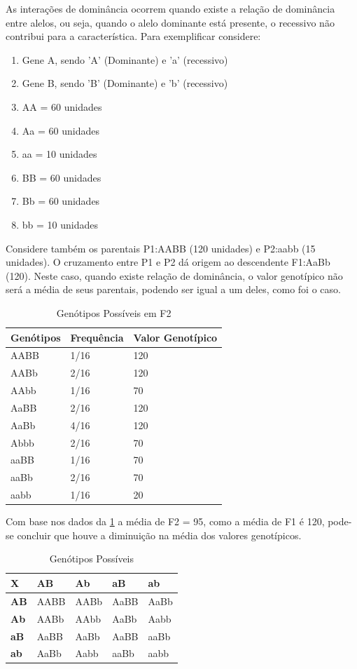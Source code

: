 As interações de dominância ocorrem quando existe a relação de dominância entre alelos, ou seja, quando o alelo dominante está presente, o recessivo não contribui para a característica. Para exemplificar considere:

\begin{enumerate}
\item Gene A, sendo 'A' (Dominante) e 'a' (recessivo)
\item Gene B, sendo 'B' (Dominante) e 'b' (recessivo)
\item AA = 60 unidades
\item Aa = 60 unidades
\item aa = 10 unidades
\item BB = 60 unidades
\item Bb = 60 unidades
\item bb = 10 unidades
\end{enumerate}

Considere também os parentais P1:AABB (120 unidades) e P2:aabb (15 unidades). O cruzamento entre P1 e P2 dá origem ao descendente F1:AaBb (120). Neste caso, quando existe relação de dominância, o valor genotípico não será a média de seus parentais, podendo ser igual a um deles, como foi o caso.


\begin{table}[h]
\centering
\begin{tabular}{l l l}
\toprule
 \textbf{Genótipos} & \textbf{Frequência} & \textbf{Valor Genotípico}\\
\midrule
 AABB & 1/16 & 120 \\
 AABb & 2/16 & 120 \\
 AAbb & 1/16 & 70  \\
 AaBB & 2/16 & 120 \\
 AaBb & 4/16 & 120 \\
 Abbb & 2/16 & 70  \\
 aaBB & 1/16 & 70  \\
 aaBb & 2/16 & 70  \\
 aabb & 1/16 & 20  \\
\bottomrule
\end{tabular}
\caption{Genótipos Possíveis em F2} \label{tab:t03}
\end{table}

Com base nos dados da \ref{tab:t03} a média de F2 = 95, como a média de F1 é 120, pode-se concluir que houve a diminuição na média dos valores genotípicos. 

\begin{table}[H]
\centering
\begin{tabular}{l l l l l}
\toprule
 \textbf{X} & \textbf{AB} & \textbf{Ab} & \textbf{aB} & \textbf{ab} \\
\midrule
 \textbf{AB} & AABB & AABb & AaBB & AaBb \\
 \textbf{Ab} & AABb & AAbb & AaBb & Aabb \\
 \textbf{aB} & AaBB & AaBb & AaBB & aaBb \\
 \textbf{ab} & AaBb & Aabb & aaBb & aabb \\
 
\bottomrule
\end{tabular}
\caption{Genótipos Possíveis} \label{tab:t04}
\end{table}


